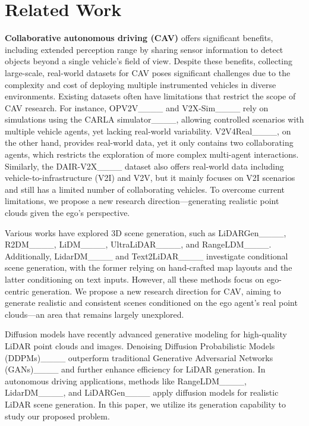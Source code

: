 \section{Related Work}
\label{sec:related}
\textbf{Collaborative autonomous driving (CAV)} offers significant benefits, including extended perception range by sharing sensor information to detect objects beyond a single vehicle's field of view.
Despite these benefits, collecting large-scale, real-world datasets for CAV poses significant challenges due to the complexity and cost of deploying multiple instrumented vehicles in diverse environments. Existing datasets often have limitations that restrict the scope of CAV research. For instance, OPV2V____ and V2X-Sim____ rely on simulations using the CARLA simulator____, allowing controlled scenarios with multiple vehicle agents, yet lacking real-world variability. V2V4Real____, on the other hand, provides real-world data, yet it only contains two collaborating agents, which restricts the exploration of more complex multi-agent interactions. Similarly, the DAIR-V2X____ dataset also offers real-world data including vehicle-to-infrastructure (V2I) and V2V, but it mainly focuses on V2I scenarios and still has a limited number of collaborating vehicles. To overcome current limitations, we propose a new research direction---generating realistic point clouds given the ego's perspective. 

 Various works have explored 3D scene generation, such as LiDARGen____, R2DM____, LiDM____, UltraLiDAR____, and RangeLDM____. Additionally, LidarDM____ and Text2LiDAR____ investigate conditional scene generation, with the former relying on hand-crafted map layouts and the latter conditioning on text inputs. However, all these methods focus on ego-centric generation. We propose a new research direction for CAV, aiming to generate realistic and consistent scenes conditioned on the ego agent's real point clouds---an area that remains largely unexplored.



Diffusion models have recently advanced generative modeling for high-quality LiDAR point clouds and images. Denoising Diffusion Probabilistic Models (DDPMs)____ outperform traditional Generative Adversarial Networks (GANs)____ and further enhance efficiency for LiDAR generation. In autonomous driving applications, methods like RangeLDM____, LidarDM____, and LiDARGen____ apply diffusion models for realistic LiDAR scene generation. In this paper, we utilize its generation capability to study our proposed problem.